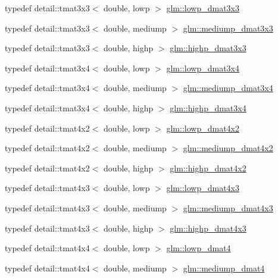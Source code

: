 \begin{DoxyCompactItemize}
\item 
typedef detail\+::tmat3x3$<$ double, lowp $>$ \hyperlink{group__core__precision_gaea1bc4ede38e1b904f01ff5ce59210ea}{glm\+::lowp\+\_\+dmat3x3}
\item 
typedef detail\+::tmat3x3$<$ double, mediump $>$ \hyperlink{group__core__precision_ga2f73508d8192390ca9f9b569f544fade}{glm\+::mediump\+\_\+dmat3x3}
\item 
typedef detail\+::tmat3x3$<$ double, highp $>$ \hyperlink{group__core__precision_gad7229dea82287910d88e6e8566e39fc7}{glm\+::highp\+\_\+dmat3x3}
\item 
typedef detail\+::tmat3x4$<$ double, lowp $>$ \hyperlink{group__core__precision_ga4640e1d20ad705842525e79a4cc57b15}{glm\+::lowp\+\_\+dmat3x4}
\item 
typedef detail\+::tmat3x4$<$ double, mediump $>$ \hyperlink{group__core__precision_gaedd814e706701200b13b86fc6fd7b373}{glm\+::mediump\+\_\+dmat3x4}
\item 
typedef detail\+::tmat3x4$<$ double, highp $>$ \hyperlink{group__core__precision_gaff199c8d04a8edb92ed43283e8694c59}{glm\+::highp\+\_\+dmat3x4}
\item 
typedef detail\+::tmat4x2$<$ double, lowp $>$ \hyperlink{group__core__precision_ga28a7ef670069c3707f19b9de1039517e}{glm\+::lowp\+\_\+dmat4x2}
\item 
typedef detail\+::tmat4x2$<$ double, mediump $>$ \hyperlink{group__core__precision_ga03056b616496470371473cd5df4dc1f8}{glm\+::mediump\+\_\+dmat4x2}
\item 
typedef detail\+::tmat4x2$<$ double, highp $>$ \hyperlink{group__core__precision_gaa4fb1ed350a6cd053abb9b093d13ce0d}{glm\+::highp\+\_\+dmat4x2}
\item 
typedef detail\+::tmat4x3$<$ double, lowp $>$ \hyperlink{group__core__precision_gabc1be51eb0cae7cd4b1d6483a954c35d}{glm\+::lowp\+\_\+dmat4x3}
\item 
typedef detail\+::tmat4x3$<$ double, mediump $>$ \hyperlink{group__core__precision_gafa1ba33d2748737129cde471fedbf9c5}{glm\+::mediump\+\_\+dmat4x3}
\item 
typedef detail\+::tmat4x3$<$ double, highp $>$ \hyperlink{group__core__precision_gaf8aeba0eecc5c651e0f06414b6e37754}{glm\+::highp\+\_\+dmat4x3}
\item 
typedef detail\+::tmat4x4$<$ double, lowp $>$ \hyperlink{group__core__precision_gaea69794db4e619881b77d37bf84b337e}{glm\+::lowp\+\_\+dmat4}
\item 
typedef detail\+::tmat4x4$<$ double, mediump $>$ \hyperlink{group__core__precision_ga73de517f040f7d50746bbe273a396685}{glm\+::mediump\+\_\+dmat4}

\end{DoxyCompactItemize}
